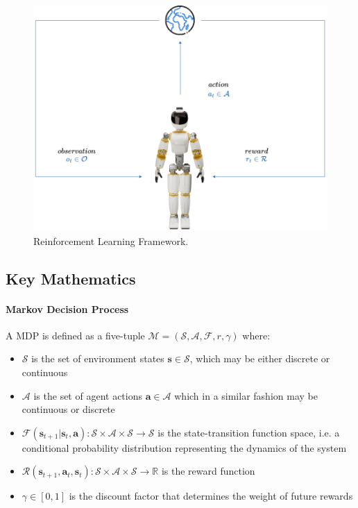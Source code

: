\begin{figure}
    \centering
    \caption{Reinforcement Learning Framework.}
    \label{fig:rlframework}
    \includegraphics[width=.7\textwidth]{Images/rl_ergocub.png}
\end{figure}

\subsection{Key Mathematics}

\paragraph{Markov Decision Process} A \ac{MDP} is defined as a five-tuple $\mathcal{M} = (\mathcal{S}, \mathcal{A}, \mathcal{F}, r, \gamma)$ where:

\begin{itemize}
    \item $\mathcal{S}$ is the set of environment states $\mathbf{s} \in \mathcal{S}$, which may be either discrete or continuous
    \item $\mathcal{A}$ is the set of agent actions $\mathbf{a} \in \mathcal{A}$ which in a similar fashion may be continuous or discrete
    \item $\mathcal{F} (\mathbf{s}_{t+1} | \mathbf{s}_t, \mathbf{a}): \mathcal{S} \times \mathcal{A} \times \mathcal{S} \rightarrow \mathcal{S}$ is the state-transition function space, i.e. a conditional probability distribution representing the dynamics of the system
    \item $\mathcal{R} (\mathbf{s}_{t+1}, \mathbf{a}_t, \mathbf{s}_t): \mathcal{S} \times \mathcal{A} \times \mathcal{S} \rightarrow \mathbb{R}$ is the reward function
    \item $\gamma \in [0,1]$ is the discount factor that determines the weight of future rewards
\end{itemize}

